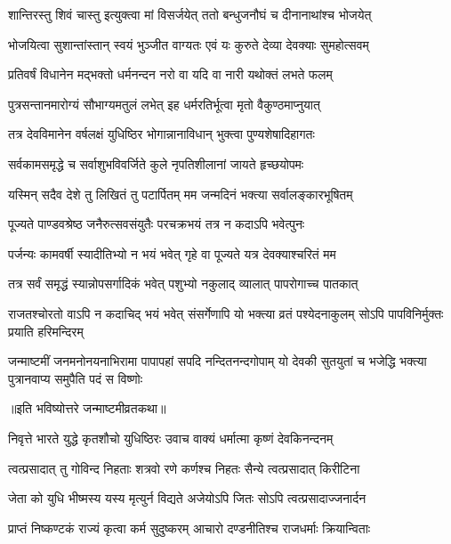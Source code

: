 \twolineshloka
{शान्तिरस्तु शिवं चास्तु इत्युक्त्वा मां विसर्जयेत्}
{ततो बन्धुजनौघं च दीनानाथांश्च भोजयेत्}%


\twolineshloka
{भोजयित्वा सुशान्तांस्तान् स्वयं भुञ्जीत वाग्यतः}
{एवं यः कुरुते देव्या देवक्याः सुमहोत्सवम्}%


\twolineshloka
{प्रतिवर्षं विधानेन मद्भक्तो धर्मनन्दन}
{नरो वा यदि वा नारी यथोक्तं लभते फलम्}%


\twolineshloka
{पुत्रसन्तानमारोग्यं सौभाग्यमतुलं लभेत्}
{इह धर्मरतिर्भूत्वा मृतो वैकुण्ठमाप्नुयात्}%


\twolineshloka
{तत्र देवविमानेन वर्षलक्षं युधिष्ठिर}
{भोगान्नानाविधान् भुक्त्वा पुण्यशेषादिहागतः}%


\twolineshloka
{सर्वकामसमृद्धे च सर्वाशुभविवर्जिते}
{कुले नृपतिशीलानां जायते हृच्छयोपमः}%


\twolineshloka
{यस्मिन् सदैव देशे तु लिखितं तु पटार्पितम्}
{मम जन्मदिनं भक्त्या सर्वालङ्कारभूषितम्}%


\twolineshloka
{पूज्यते पाण्डवश्रेष्ठ जनैरुत्सवसंयुतैः}
{परचक्रभयं तत्र न कदाऽपि भवेत्पुनः}%


\twolineshloka
{पर्जन्यः कामवर्षी स्यादीतिभ्यो न भयं भवेत्}
{गृहे वा पूज्यते यत्र देवक्याश्चरितं मम}%


\twolineshloka
{तत्र सर्वं समृद्धं स्यान्नोपसर्गादिकं भवेत्}
{पशुभ्यो नकुलाद् व्यालात् पापरोगाच्च पातकात्}%

\threelineshloka
{राजतश्चोरतो वाऽपि न कदाचिद् भयं भवेत्}
{संसर्गेणापि यो भक्त्या व्रतं पश्येदनाकुलम्}
{सोऽपि पापविनिर्मुक्तः प्रयाति हरिमन्दिरम्}%

\fourlineindentedshloka
{जन्माष्टमीं जनमनोनयनाभिरामा}
{पापापहां सपदि नन्दितनन्दगोपाम्}
{यो देवकी सुतयुतां च भजेद्धि भक्त्या}
{पुत्रानवाप्य समुपैति पदं स विष्णोः}%

\centerline{॥इति भविष्योत्तरे जन्माष्टमीव्रतकथा॥}




\twolineshloka
{निवृत्ते भारते युद्धे कृतशौचो युधिष्ठिरः}
{उवाच वाक्यं धर्मात्मा कृष्णं देवकिनन्दनम्}%

\twolineshloka
{त्वत्प्रसादात् तु गोविन्द निहताः शत्रवो रणे}
{कर्णश्च निहतः सैन्ये त्वत्प्रसादात् किरीटिना}%

\twolineshloka
{जेता को युधि भीष्मस्य यस्य मृत्युर्न विद्यते}
{अजेयोऽपि जितः सोऽपि त्वत्प्रसादाज्जनार्दन}%

\twolineshloka
{प्राप्तं निष्कण्टकं राज्यं कृत्वा कर्म सुदुष्करम्}
{आचारो दण्डनीतिश्च राजधर्माः क्रियान्विताः}%

